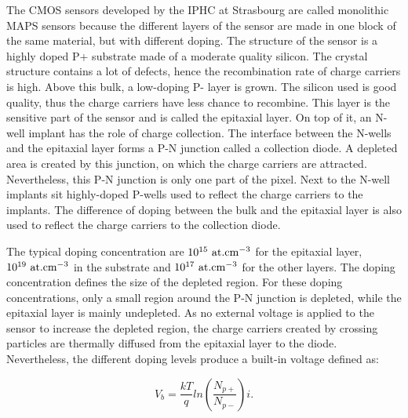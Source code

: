     
    The \gls{CMOS} sensors developed by the IPHC at Strasbourg are called monolithic \gls{MAPS} sensors because the different layers of the sensor are made in one block of the same material, but with different doping.
    The structure of the sensor is a highly doped P+ substrate made of a moderate quality silicon. 
    The crystal structure contains a lot of defects, hence the recombination rate of charge carriers is high.
    Above this bulk, a low-doping P- layer is grown.
    The silicon used is good quality, thus the charge carriers have less chance to recombine.
    This layer is the sensitive part of the sensor and is called the epitaxial layer. 
    On top of it, an N-well implant has the role of charge collection.
    The interface between the N-wells and the epitaxial layer forms a P-N junction called a collection diode.
    A depleted area is created by this junction, on which the charge carriers are attracted.
    Nevertheless, this P-N junction is only one part of the pixel.
    Next to the N-well implants sit  highly-doped P-wells used to reflect the charge carriers to the implants.
    The difference of doping between the bulk and the epitaxial layer is also used to reflect the charge carriers to the collection diode.

    The typical doping concentration are $10^{15}~\rm{at.cm}^{-3}$ for the epitaxial layer, $10^{19}~\rm{at.cm}^{-3}$ in the substrate and $10^{17}~\rm{at.cm}^{-3}$ for the other layers.
    The doping concentration defines the size of the depleted region.
    For these doping concentrations, only a small region around the P-N junction is depleted, while the epitaxial layer is mainly undepleted. 
    As no external voltage is applied to the sensor to increase the depleted region, the charge carriers created by crossing particles are thermally diffused from the epitaxial layer to the diode.
    Nevertheless, the different doping levels produce a built-in voltage defined as: 

    \begin{equation}
      V_b = \frac{kT}{q}ln\left( \frac{N_{p+}}{N_{p-}}\right)i.
    \end{equation}
    
